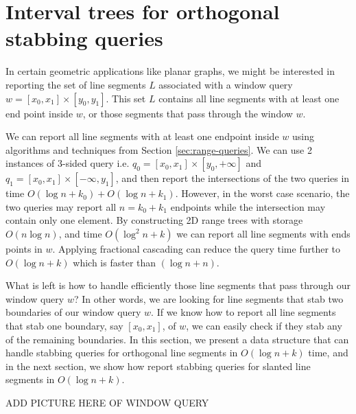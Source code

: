 \section{Interval trees for orthogonal stabbing queries}
\label{sec:interval-trees}

In certain geometric applications like planar graphs, we might be interested in reporting the set of line segments $L$ associated with a window query  $w = [x_0, x_1] \times [y_0, y_1]$. 
%
This set $L$ contains all line segments with at least one end point inside $w$, or those segments that pass through the window $w$. 

We can report all line segments with at least one endpoint inside $w$ using algorithms and techniques from Section \ref{sec:range-queries}. 
%
We can use 2 instances of 3-sided query i.e. $ q_0 = [x_0, x_1] \times [y_0, +\infty ]  $ and $q_1 = [x_0, x_1] \times [-\infty,y_1]$, and then report the intersections of the two queries in time $O(\log n + k_0) + O(\log n + k_1) $. 
%
However, in the worst case scenario, the two queries may report all $n = k_0 + k_1$ endpoints while the intersection may contain only one element.
%
By constructing 2D range trees with storage $O(n\log n)$, and time $O(\log^2 n + k)$ we can report all line segments with ends points in $w$. Applying fractional cascading can reduce the query time further to $O(\log n +k)$ which is faster than $(\log n + n)$.

What is left is how to handle efficiently those line segments that pass through our window query $w$? In other words, we are looking for line segments that stab two boundaries of our window query $w$. If we know how to report all line segments that stab one boundary,  say $[x_0, x_1]$, of $w$, we can easily check if they stab any of the remaining boundaries. In this section, we present a data structure that can handle stabbing queries for orthogonal line segments in $O(\log n + k)$ time, and in the next section, we show how report stabbing queries for slanted line segments in $O(\log n + k)$. 

ADD PICTURE HERE OF WINDOW QUERY
